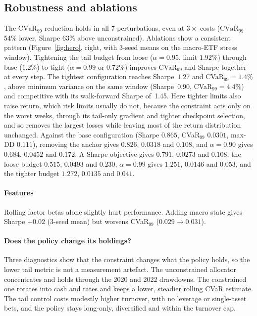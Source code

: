 \documentclass[sigconf]{acmart}
\begin{document}
\subsection{Robustness and ablations}
The $\mathrm{CVaR}_{99}$ reduction holds in all 7 perturbations, even at
$3\times$ costs ($\mathrm{CVaR}_{99}$ 54\% lower, Sharpe 63\% above unconstrained).
Ablations show a consistent pattern (Figure~\ref{fig:hero}, right, with 3-seed means on the macro-ETF stress window). Tightening the tail budget from loose ($\alpha=0.95$, limit
$1.92\%$) through base ($1.2\%$) to tight ($\alpha=0.99$ or $0.72\%$) improves CVaR$_{99}$ and
Sharpe together at every step. The tightest configuration reaches Sharpe~$1.27$ and
CVaR$_{99}=1.4\%$, above minimum variance on the same window (Sharpe~0.90, CVaR$_{99}=4.4\%$)
and competitive with its walk-forward Sharpe of~1.45. Here tighter limits also raise return, which risk limits usually do not, because the constraint acts only on the worst weeks, through its tail-only gradient and tighter checkpoint selection, and so removes the
largest losses while leaving most of the return distribution unchanged. Against the base
configuration (Sharpe $0.865$, CVaR$_{99}$ $0.0301$, max-DD $0.111$), removing the anchor gives $0.826$, $0.0318$ and $0.108$, and $\alpha=0.90$ gives $0.684$, $0.0452$ and $0.172$. A Sharpe objective gives $0.791$, $0.0273$ and $0.108$, the loose budget $0.515$, $0.0493$ and $0.230$, $\alpha=0.99$ gives $1.251$, $0.0146$ and $0.053$, and the tighter budget $1.272$, $0.0135$ and $0.041$.


\paragraph{Features} Rolling factor betas alone slightly hurt performance. Adding macro state
gives Sharpe $+0.02$ (3-seed mean) but worsens CVaR$_{99}$ ($0.029\!\to\!0.031$).

\paragraph{Does the policy change its holdings?}
Three diagnostics show that the constraint changes what the policy holds, so the lower tail
metric is not a measurement artefact. The unconstrained allocator concentrates and holds through
the 2020 and 2022 drawdowns. The constrained one rotates into cash and rates and keeps a lower,
steadier rolling CVaR estimate. The tail control costs modestly higher turnover, with no
leverage or single-asset bets, and the policy stays long-only, diversified and within the
turnover cap.
\end{document}
